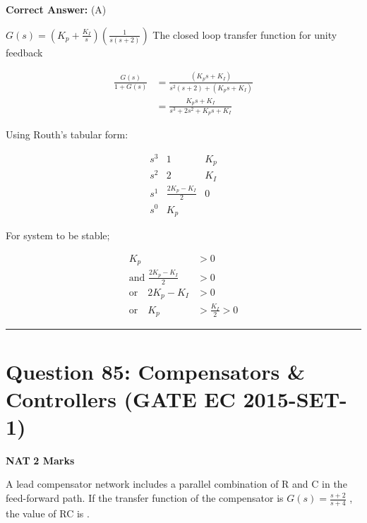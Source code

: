 \documentclass[11pt,a4paper]{article}
\begin{document}
\noindent \textbf{Correct Answer:} (A)

\begin{tcolorbox}[solbox, title=Detailed Solution -- Question 84]
$G(s)=\left(K_{p}+\frac{K_{I}}{s}\right)\left(\frac{1}{s(s+2)}\right)$
 The closed loop transfer function for unity feedback

\[
\begin{aligned} \frac{G(s)}{1+G(s)} &=\frac{\left(K_{p} s+K_{I}\right)}{s^{2}(s+2)+\left(K_{p} s+K_{I}\right)} \\ &=\frac{K_{p} s+K_{I}}{s^{3}+2 s^{2}+K_{p} s+K_{I}} \end{aligned}
\]

 Using Routh's tabular form:

\[
\begin{array}{c|cc} s^{3} & 1 & K_{p} \\ s^{2} & 2 & K_{I} \\ s^{1} & \frac{2 K_{p}-K_{I}}{2} & 0 \\ s^{0} & K_{p} & \end{array}
\]

 For system to be stable;

\[
\begin{aligned} K_{p}& > 0\\ \text{and }\frac{2 K_{p}-K_{I}}{2}& > 0 \\ \text{or} \quad 2 K_{p}-K_{I}& > 0 \\ \text{or} \quad K_{p}& > \frac{K_{I}}{2} > 0 \end{aligned}
\]
\end{tcolorbox}

\vspace{1.5em}
\hrule
\vspace{1.5em}

\section*{Question 85: Compensators \& Controllers (GATE EC 2015-SET-1)}
\noindent \textbf{\color{primary}NAT} \hfill \textbf{\color{secondary}2 Marks}


\noindent A lead compensator network includes a parallel combination of R and C in the feed-forward path. If the transfer function of the compensator is $G(s)=\frac{s+2}{s+4}$ , the value of RC is \underline{\hspace{1.5cm}}.
\end{document}
